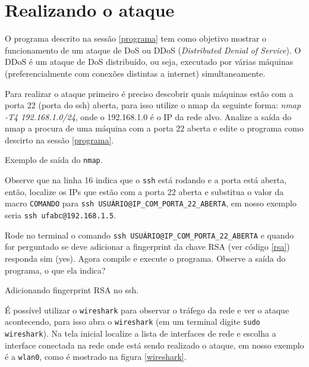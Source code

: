 \documentclass[12pt]{abnt}
\begin{document}
\section{Realizando o ataque}

O programa descrito na sessão \ref{programa} tem como objetivo mostrar o funcionamento de um ataque de
DoS ou DDoS (\textit{Distributed Denial of Service}). O DDoS é um ataque de DoS distribuído, ou seja,
executado por várias máquinas (preferencialmente com conexões distintas a internet) simultaneamente.

Para realizar o ataque primeiro é preciso descobrir quais máquinas estão com a porta 22 (porta do ssh)
aberta, para isso utilize o nmap da seguinte forma: \textit{nmap -T4 192.168.1.0/24}, onde o 192.168.1.0
é o IP da rede alvo. Analize a saída
do nmap a procura de uma máquina com a porta 22 aberta e edite o programa como descirto na sessão \ref{programa}.

\renewcommand{\baselinestretch}{0.5}  %
\begin{codigo}[!hbt]
   \tiny  %
   \caption{Exemplo de saída do \texttt{nmap}.}
   \label{nmap}
\end{codigo}

Observe que na linha 16 indica que o \texttt{ssh} está rodando e a porta está aberta, então, localize os IPs que estão com a porta 22 
aberta e substitua o valor da macro \texttt{COMANDO} para \texttt{ssh USUÁRIO@IP\_COM\_PORTA\_22\_ABERTA}, em nosso exemplo seria
\texttt{ssh ufabc@192.168.1.5}. 

Rode no terminal o comando \texttt{ssh USUÁRIO@IP\_COM\_PORTA\_22\_ABERTA} e quando for perguntado se deve adicionar a fingerprint
da chave RSA (ver código 
\ref{rsa}) responda sim (yes).
Agora compile e execute o programa. Observe a saída do programa, o que ela indica?

\renewcommand{\baselinestretch}{0.5}  %
\begin{codigo}[!hbt]
   \tiny  %
   \caption{Adicionando fingerprint RSA no ssh.}
   \label{rsa}
\end{codigo}



É possível utilizar o \texttt{wireshark} para observar o tráfego da rede e ver o ataque acontecendo, para isso abra o \texttt{wireshark}
(em um terminal digite \texttt{sudo wireshark}). Na tela inicial localize a lista de interfaces de rede e escolha a interface conectada na
rede onde está sendo realizado o ataque, em nosso exemplo é a \texttt{wlan0}, como é mostrado na figura \ref{wireshark}.
\end{document}
